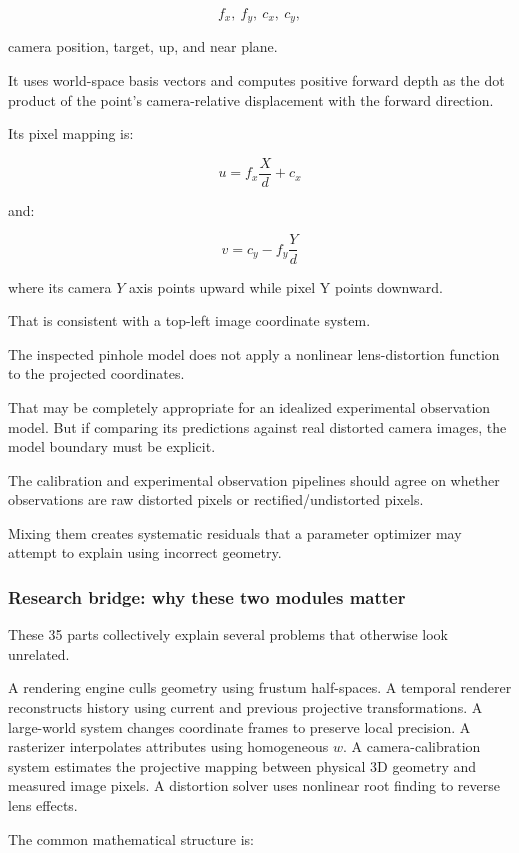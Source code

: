 \[
 f_x,\ f_y,\ c_x,\ c_y,
\]

camera position, target, up, and near plane.

It uses world-space basis vectors and computes positive forward depth as the dot product of the point's camera-relative displacement with the forward direction.

Its pixel mapping is:

\[
 \boxed{ u=f_x\frac{X}{d}+c_x }
\]

and:

\[
 \boxed{ v=c_y-f_y\frac{Y}{d} }
\]

where its camera \(Y\) axis points upward while pixel Y points downward.

That is consistent with a top-left image coordinate system.

The inspected pinhole model does not apply a nonlinear lens-distortion function to the projected coordinates.

That may be completely appropriate for an idealized experimental observation model. But if comparing its predictions against real distorted camera images, the model boundary must be explicit.

The calibration and experimental observation pipelines should agree on whether observations are raw distorted pixels or rectified/undistorted pixels.

Mixing them creates systematic residuals that a parameter optimizer may attempt to explain using incorrect geometry.

\subsubsection{Research bridge: why these two modules matter}\label{research-bridge-why-these-two-modules-matter}

These 35 parts collectively explain several problems that otherwise look unrelated.

A rendering engine culls geometry using frustum half-spaces. A temporal renderer reconstructs history using current and previous projective transformations. A large-world system changes coordinate frames to preserve local precision. A rasterizer interpolates attributes using homogeneous \(w\). A camera-calibration system estimates the projective mapping between physical 3D geometry and measured image pixels. A distortion solver uses nonlinear root finding to reverse lens effects.

The common mathematical structure is:

